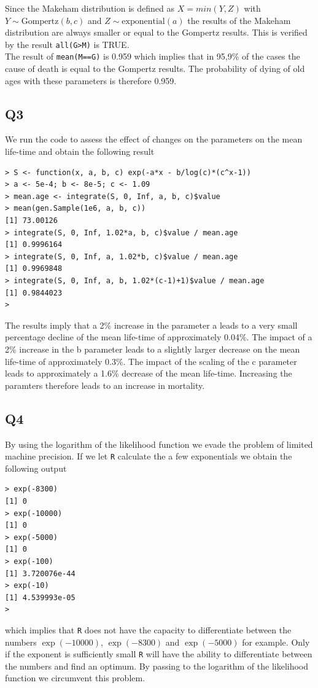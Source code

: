 Since the Makeham distribution is defined as $X = min(Y,Z)$ with $Y \sim \text{Gompertz}(b,c)$ and $Z \sim \text{exponential}(a)$ the results of the Makeham distribution are always smaller or equal to the Gompertz results. This is verified by the result \verb+all(G>M)+ is TRUE. \\
The result of \verb+mean(M==G)+ is 0.959 which implies that in 95,9\% of the cases the cause of death is equal to the Gompertz results. The probability of dying of old ages with these parameters is therefore 0.959.

\subsection*{Q3}
We run the code to assess the effect of changes on the parameters on the mean life-time and obtain the following result
\begin{verbatim}
> S <- function(x, a, b, c) exp(-a*x - b/log(c)*(c^x-1))
> a <- 5e-4; b <- 8e-5; c <- 1.09
> mean.age <- integrate(S, 0, Inf, a, b, c)$value 
> mean(gen.Sample(1e6, a, b, c))
[1] 73.00126
> integrate(S, 0, Inf, 1.02*a, b, c)$value / mean.age
[1] 0.9996164
> integrate(S, 0, Inf, a, 1.02*b, c)$value / mean.age
[1] 0.9969848
> integrate(S, 0, Inf, a, b, 1.02*(c-1)+1)$value / mean.age
[1] 0.9844023
> 
\end{verbatim}
The results imply that a 2\% increase in the parameter a leads to a very small percentage decline of the mean life-time of approximately 0.04\%. The impact of a 2\% increase in the b parameter leads to a slightly larger decrease on the mean life-time of approximately 0.3\%. The impact of the scaling of the c parameter leads to approximately a 1.6\% decrease of the mean life-time. Increasing the paramters therefore leads to an increase in mortality.

\subsection*{Q4}

By using the logarithm of the likelihood function we evade the problem of limited machine precision. If we let \verb|R| calculate the a few exponentials we obtain the following output

\begin{verbatim}
> exp(-8300)
[1] 0
> exp(-10000)
[1] 0
> exp(-5000)
[1] 0
> exp(-100)
[1] 3.720076e-44
> exp(-10)
[1] 4.539993e-05
> 
\end{verbatim}

which implies that \verb|R| does not have the capacity to differentiate between the numbers $\exp{(-10000)}$, $\exp{(-8300)}$ and $\exp{(-5000)}$ for example. Only if the exponent is sufficiently small \verb|R| will have the ability to differentiate between the numbers and find an optimum. By passing to the logarithm of the likelihood function we circumvent this problem. 


